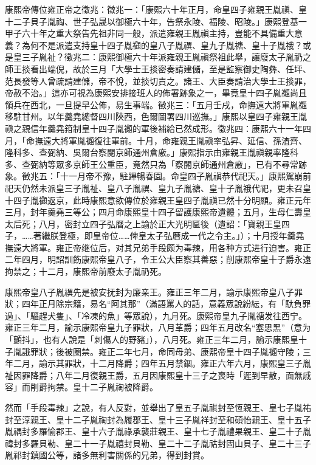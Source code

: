 康熙帝傳位雍正帝之徵兆：徵兆一：「康熙六十年正月，命皇四子雍親王胤禛、皇十二子貝子胤祹、世子弘晟以御極六十年，告祭永陵、福陵、昭陵。」康熙登基一甲子六十年之重大祭告先祖非同一般，派遣雍親王胤禛主持，豈能不具備重大意義？為何不是派遣支持皇十四子胤禵的皇八子胤禩、皇九子胤禟、皇十子胤䄉？或是皇三子胤祉？徵兆二：康熙御極六十年派雍親王胤禛祭祖此舉，讓廢太子胤礽之師王掞看出端倪，故於三月「大學士王掞密奏請建儲，至是監察御史陶彝、任坪、范長發等人曾疏請建儲，帝不悅，並掞切責之。諸王、大臣奏請治大學士王掞罪，帝赦不治。」這亦可視為康熙安排接班人的佈署跡象之一，畢竟皇十四子胤禵尚且領兵在西北，一旦提早公佈，易生事端。徵兆三：「五月壬戌，命撫遠大將軍胤禵移駐甘州。以年羹堯總督四川陝西，色爾圖署四川巡撫。」康熙以皇四子雍親王胤禛之親信年羹堯箝制皇十四子胤禵的軍後補給已然成形。徵兆四：康熙六十一年四月，「命撫遠大將軍胤禵復往軍前。十月，命雍親王胤禛率弘昇、延信、孫渣齊、隆科多、查弼納、吳爾台察閱京師通州倉廒。」康熙指示由雍親王胤禛親率隆科多、查弼納等眾多京師王公重臣，竟然只為「察閱京師通州倉廒」，已有不尋常跡象。徵兆五：「十一月帝不豫，駐蹕暢春園。命皇四子胤禛恭代祀天。」康熙駕崩前祀天仍然未派皇三子胤祉、皇八子胤禩、皇九子胤禟、皇十子胤䄉代祀，更未召皇十四子胤禵返京，此時康熙意欲傳位於雍親王皇四子胤禛已然十分明顯。雍正元年三月，封年羹堯三等公；四月命康熙皇十四子留護康熙帝遺體；五月，生母仁壽皇太后死；八月，密封立四子弘曆之上諭於正大光明匾後（遺詔：「寶親王皇四子，……著繼朕登極，即皇帝位……俾皇太子弘曆成一代之令主。」）；十月授年羹堯撫遠大將軍。雍正帝继位后，对其兄弟手段颇为毒辣，用各种方式进行迫害。雍正二年四月，明詔訓飭康熙帝皇八子，令王公大臣察其善惡；削康熙帝皇十子爵永遠拘禁之；十二月，康熙帝前廢太子胤礽死。

康熙帝皇八子胤禩先是被安抚封为廉亲王。雍正三年二月，諭示康熙帝皇八子罪狀；四年正月除宗籍，易名“阿其那”（滿語罵人的話，意義眾說紛紜，有「馱負罪過」、「驅趕犬隻」、「冷凍的魚」等眾說），九月死。康熙帝皇九子胤禟发往西宁。雍正三年二月，諭示康熙帝皇九子罪狀，八月革爵；四年五月改名“塞思黑”（意为「顫抖」，也有人說是「刺傷人的野豬」），八月死。雍正三年二月，諭示康熙皇十子胤誐罪狀；後被圈禁。雍正二年七月，命同母弟、康熙帝皇十四子胤禵守陵；三年二月，諭示其罪狀，十二月降爵；四年五月禁錮。雍正六年六月，康熙皇三子胤祉因罪降爵；八年二月復親王爵，五月因康熙皇十三子之喪時「遲到早散，面無戚容」而削爵拘禁。皇十二子胤祹被降爵。

然而「手段毒辣」之說，有人反對，並舉出了皇五子胤祺封至恆親王、皇七子胤祐封至淳親王、皇十二子胤祹封為履郡王、皇十三子胤祥封至和碩怡親王、皇十五子胤禑封多羅愉郡王、皇十六子胤祿承襲莊親王、皇十七子胤禮果親王、皇二十子胤禕封多羅貝勒、皇二十一子胤禧封貝勒、皇二十二子胤祜封固山貝子、皇二十三子胤祁封鎮國公等，諸多無利害關係的兄弟，得到封賞。

